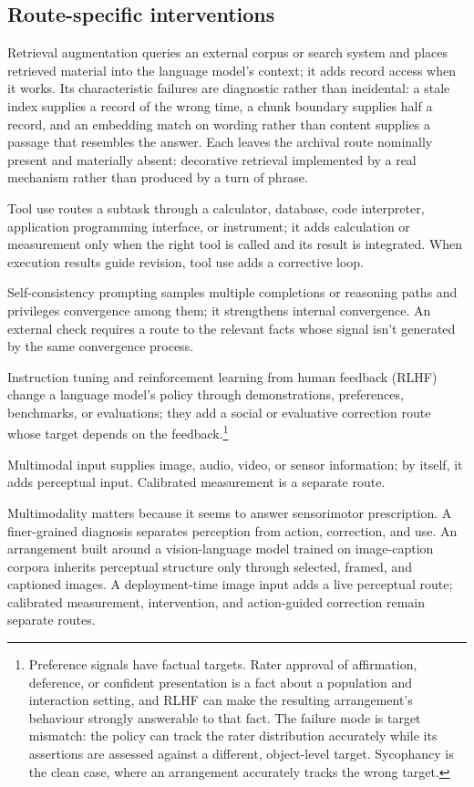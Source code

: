 \documentclass[12pt]{article}
\begin{document}
\subsection{Route-specific interventions}

Retrieval augmentation queries an external corpus or search system and places retrieved material into the
language model's context; it adds record access when it works. Its characteristic failures are
diagnostic rather than incidental: a stale index supplies a record of the wrong time, a
chunk boundary supplies half a record, and an embedding match on wording rather than
content supplies a passage that resembles the answer. Each leaves the archival route
nominally present and materially absent: decorative retrieval implemented by a real
mechanism rather than produced by a turn of phrase.

Tool use routes a subtask through a calculator, database, code interpreter, application
programming interface, or instrument; it adds calculation or measurement only when the
right tool is called and its
result is integrated. When execution results guide revision, tool use adds a corrective
loop.

Self-consistency prompting samples multiple completions or reasoning paths and privileges
convergence among them; it strengthens internal convergence. An external check requires a
route to the relevant facts whose signal isn't generated by the same convergence process.

Instruction tuning and reinforcement learning from human feedback (RLHF) change a language
model's policy through demonstrations, preferences, benchmarks, or evaluations; they add a social or evaluative correction
route whose target depends on the feedback.\footnote{Preference signals have factual
targets. Rater approval of affirmation, deference, or confident presentation is a fact
about a population and interaction setting, and RLHF can make the resulting arrangement's behaviour
strongly answerable to that fact. The failure mode is target mismatch: the policy can
track the rater distribution accurately while its assertions are assessed against a
different, object-level target. Sycophancy is the clean case, where an arrangement accurately
tracks the wrong target.}

Multimodal input supplies image, audio, video, or sensor information; by itself, it adds
perceptual input. Calibrated measurement is a separate route.

Multimodality matters because it seems to answer
 sensorimotor prescription. A finer-grained
diagnosis separates perception from action, correction, and use. An arrangement built
around a vision-language model trained on image-caption corpora
inherits perceptual structure only through selected, framed, and captioned images. A
deployment-time image input adds a live perceptual route; calibrated measurement,
intervention, and action-guided correction remain separate routes.
\end{document}
